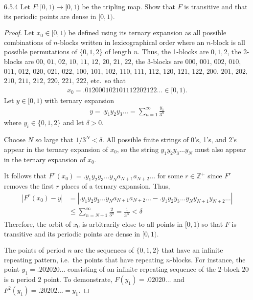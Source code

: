 \begin{problem}{6.5.4}
  Let $F:[0,1) \to [0,1)$ be the tripling map. Show that $F$ is transitive
  and that its periodic points are dense in $[0, 1)$.
\end{problem}

\begin{proof}
  Let $x_0 \in [0, 1)$ be defined using its ternary expansion as all possible combinations of $n$-blocks
  written in lexicographical order where an $n$-block is all possible permutations of $\{0, 1, 2\}$
  of length $n$. Thus, the 1-blocks are $0,1,2$, the 2-blocks are
  $00$, $01$, $02$, $10$, $11$, $12$, $20$, $21$, $22$,
  the 3-blocks are $000$, $001$, $002$, $010$, $011$, $012$, $020$, $021$, $022$,
  $100$, $101$, $102$, $110$, $111$, $112$, $120$, $121$, $122$,
  $200$, $201$, $202$, $210$, $211$, $212$, $220$, $221$, $222$, etc.\ so that
  \begin{align*}
    x_0 = .0 1 2
    00 01 02
    10 11 12
    20 21 22\ldots \in [0, 1).
  \end{align*}
  Let $y \in [0, 1)$ with ternary expansion
  \begin{align*}
    y = .y_1y_2y_3\ldots = \sum_{n=1}^\infty \frac{y_1}{3^n}
  \end{align*}
  where $y_i \in \{0, 1, 2\}$ and let $\delta > 0$.

  Choose $N$ so large that $1/3^N < \delta$. All possible finite strings of 0's,
  1's, and 2's appear in the ternary expansion of $x_0$, so the string
  $y_1y_2y_3\ldots y_N$ must also appear in the ternary expansion of $x_0$.

  It follows that $F^r(x_0) = .y_1y_2y_3\ldots y_N a_{N+1}a_{N+2}\ldots$
  for some $r\in\mathbb{Z}^+$ since $F^r$ removes the first $r$ places of
  a ternary expansion. Thus,
  \begin{align*}
    |F^r(x_0) - y| &= |.y_1y_2y_3\ldots y_N a_{N+1}a_{N+2}\ldots - .y_1y_2y_3\ldots y_N y_{N+1} y_{N+2} \ldots| \\
    &\leq \sum_{n = N+1}^\infty\frac{2}{3^n} = \frac{1}{3^N} < \delta
  \end{align*}
  Therefore, the orbit of $x_0$ is arbitrarily close to all points in $[0, 1)$ so that $F$ is transitive
  and its periodic points are dense in $[0, 1)$.

  The points of period $n$ are
  the sequences of $\{0, 1, 2\}$ that have an infinite repeating pattern, i.e.\
  the points that have repeating $n$-blocks. For instance, the point $y_1 = .202020\ldots$ consisting
  of an infinite repeating sequence of the 2-block $20$ is a period 2 point.
  To demonstrate, $F(y_1) = .02020\ldots$ and $F^2(y_1) = .20202\ldots = y_1$.
\end{proof}
\newpage
